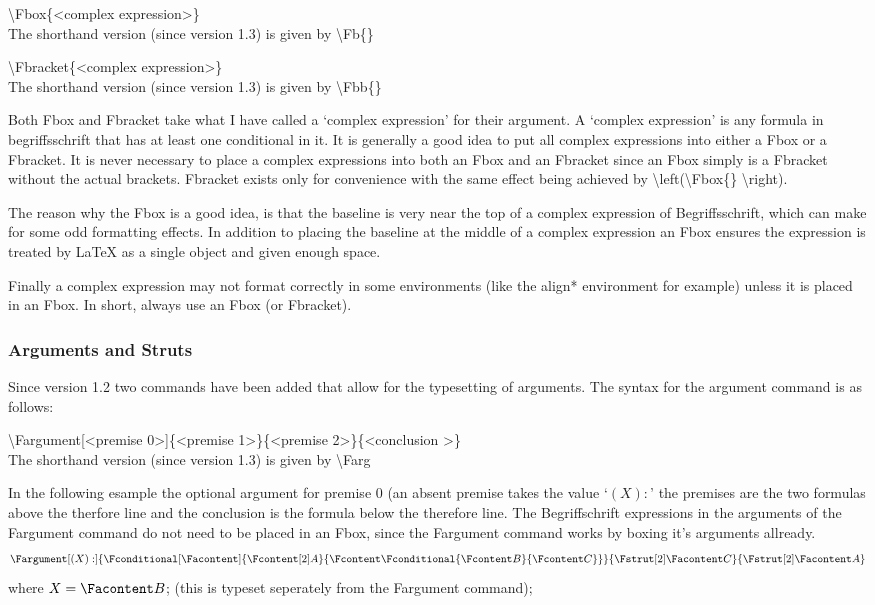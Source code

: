\documentclass[12pt]{article}
\begin{document}
  \textbackslash Fbox\{\textless complex expression\textgreater\}\\
  The shorthand version (since version 1.3) is given by \textbackslash Fb\{\}

  \textbackslash Fbracket\{\textless complex expression\textgreater\}\\
  The shorthand version (since version 1.3) is given by \textbackslash Fbb\{\}

  Both Fbox and Fbracket take what I have called a `complex expression' for their 
  argument. A `complex expression' is any formula in begriffsschrift that has at 
  least one conditional in it. It is generally a good idea to put all complex 
  expressions into either a Fbox or a Fbracket. It is never necessary to place a 
  complex expressions into both an Fbox and an Fbracket since an Fbox simply is a 
  Fbracket without the actual brackets. Fbracket exists only for convenience with 
  the same effect being achieved by \textbackslash left(\textbackslash Fbox\{\} 
  \textbackslash right).

  The reason why the Fbox is a good idea, is that the baseline is very near the top of
  a complex expression of Begriffsschrift, which can make for some odd formatting 
  effects. In addition to placing the baseline at the middle of a complex expression 
  an Fbox ensures the expression is treated by LaTeX as a single object and given 
  enough space.

  Finally a complex expression may not format correctly in some environments (like 
  the align* environment for example) unless it is placed in an Fbox. In short, 
  always use an Fbox (or Fbracket).

\subsubsection{Arguments and Struts}
  Since version 1.2 two commands have been added that allow for the typesetting of 
  arguments. The syntax for the argument command is as follows:

  \textbackslash Fargument[\textless premise 0\textgreater]\{\textless premise 
  1\textgreater\}\{\textless premise 2\textgreater\}\{\textless conclusion
  \textgreater\}\\
  The shorthand version (since version 1.3) is given by \textbackslash Farg

  In the following esample the optional argument for premise 0 (an absent premise 
  takes the value `$(X):$' the premises are the two formulas above the therfore line 
  and the conclusion is the formula below the therefore line. The Begriffschrift 
  expressions in the arguments of the Fargument command do not need to be placed in 
  an Fbox, since the Fargument command works by boxing it's arguments allready.
  \begin{align*}
    \Fargument[(X):]
      {\Fconditional[\Facontent]
        {\Fcontent[2] A}
        {\Fcontent\Fconditional{\Fcontent B}{\Fcontent C}}}
      {\Fstrut[2]\Facontent C}
      {\Fstrut[2]\Facontent A}
  \end{align*}
  where $X=\Facontent B$; (this is typeset seperately from the Fargument command);
\end{document}
